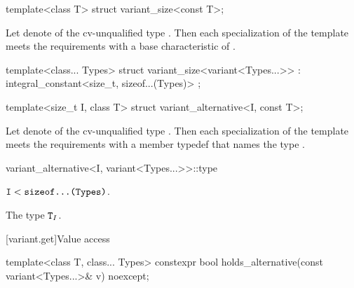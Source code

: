 %
\begin{itemdecl}
template<class T> struct variant_size<const T>;
\end{itemdecl}

\begin{itemdescr}
\pnum
Let  denote  of the cv-unqualified
type . Then each specialization of the template meets the
 requirements with a
base characteristic of .
\end{itemdescr}

%
\begin{itemdecl}
template<class... Types>
  struct variant_size<variant<Types...>> : integral_constant<size_t, sizeof...(Types)> { };
\end{itemdecl}

%
\begin{itemdecl}
template<size_t I, class T> struct variant_alternative<I, const T>;
\end{itemdecl}

\begin{itemdescr}
\pnum
Let  denote  of the
cv-unqualified type . Then each specialization of the template
meets the  requirements with a
member typedef  that names the type .
\end{itemdescr}

%
\begin{itemdecl}
variant_alternative<I, variant<Types...>>::type
\end{itemdecl}

\begin{itemdescr}
\pnum
\mandates
$\texttt{I} < \texttt{sizeof...(Types)}$.

\pnum
\ctype
The type $\texttt{T}_I$.
\end{itemdescr}

[variant.get]{Value access}

\begin{itemdecl}
template<class T, class... Types>
  constexpr bool holds_alternative(const variant<Types...>& v) noexcept;
\end{itemdecl}

